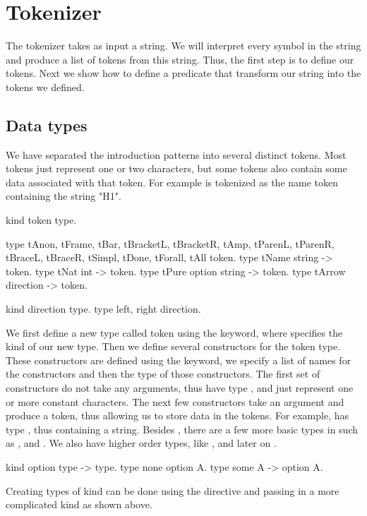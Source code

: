 \documentclass[thesis.tex]{subfiles}
\begin{document}
{\section{Tokenizer}\label{ssec:tokenizer}
The tokenizer takes as input a string. We will interpret every symbol in the string and produce a list of tokens from this string. Thus, the first step is to define our tokens. Next we show how to define a predicate that transform our string into the tokens we defined.

\subsection{Data types}\label{sssec:datatypes}
We have separated the introduction patterns into several distinct tokens. Most tokens just represent one or two characters, but some tokens also contain some data associated with that token. For example  is tokenized as the name token containing the string "H1".
\begin{elpicode}
  kind token type.

  type tAnon, tFrame, tBar, tBracketL, tBracketR, tAmp,
       tParenL, tParenR, tBraceL, tBraceR, tSimpl,
       tDone, tForall, tAll token.
  type tName string -> token.
  type tNat int -> token.
  type tPure option string -> token.
  type tArrow direction -> token.

  kind direction type.
  type left, right direction.
\end{elpicode}
We first define a new type called token using the  keyword, where  specifies the kind of our new type. Then we define several constructors for the token type. These constructors are defined using the  keyword, we specify a list of names for the constructors and then the type of those constructors. The first set of constructors do not take any arguments, thus have type , and just represent one or more constant characters. The next few constructors take an argument and produce a token, thus allowing us to store data in the tokens. For example,  has type , thus containing a string. Besides , there are a few more basic types in \elpi such as ,  and . We also have higher order types, like , and later on .
\begin{elpicode}
  kind option type -> type.
  type none option A.
  type some A -> option A.
\end{elpicode}
Creating types of kind  can be done using the  directive and passing in a more complicated kind as shown above.

}
\end{document}

